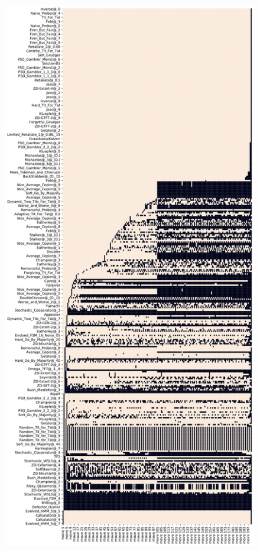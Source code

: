 \begin{figure}[ht]
    \centering
    \begin{minipage}{0.48\textwidth}
        \centering
        \includegraphics[width=1.0\textwidth, center]{./img/descriptive/sequence_plot_alphabetical_pt1.pdf}

\end{minipage}
\end{figure}
